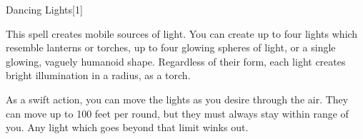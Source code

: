 
\begin{spellsection}{Dancing Lights}[1]
    \begin{spellheader}
    \end{spellheader}
    \begin{spellcontent}
        \begin{spelltargetinginfo}
            \spellrng{\rngmed}
        \end{spelltargetinginfo}
        \begin{spelleffects}
            \spelleffect This spell creates mobile sources of light. You can create up to four lights which resemble lanterns or torches, up to four glowing spheres of light, or a single glowing, vaguely humanoid shape. Regardless of their form, each light creates bright illumination in a \areamed radius, as a torch.

            As a swift action, you can move the lights as you desire through the air. They can move up to 100 feet per round, but they must always stay within range of you. Any light which goes beyond that limit winks out.
            \spelldur \durshort \dismissable
        \end{spelleffects}
    \end{spellcontent}
    \begin{spellfooter}
        \miscastexplode
    \end{spellfooter}
\end{spellsection}

